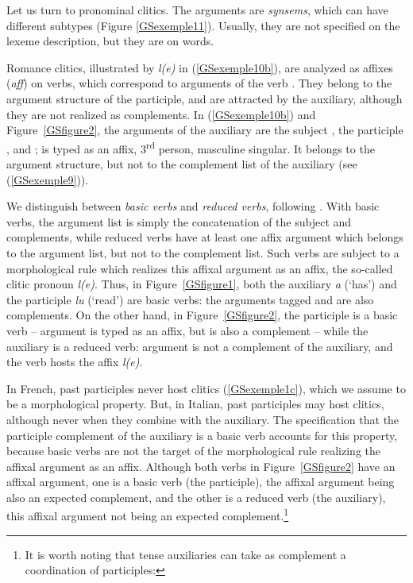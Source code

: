 \documentclass[output=paper
	        ,collection
	        ,collectionchapter
 	        ,biblatex
                ,babelshorthands
                ,newtxmath
                ,draftmode
                ,colorlinks, citecolor=brown
]{langscibook}
\begin{document}
{Let us turn to pronominal clitics. The arguments are \emph{synsems}, which can have different subtypes (Figure \ref{GSexemple11}). Usually, they are not specified on the lexeme description, but they are on
words.

Romance clitics, illustrated by \emph{l(e)} in (\ref{GSexemple10b}), are analyzed as affixes (\emph{aff}) on verbs, which correspond to arguments of the verb \citep{MS97a-u}. They belong to the argument structure of the participle, and are attracted by the auxiliary, although they are not realized as complements. In (\ref{GSexemple10b}) and Figure~\ref{GSfigure2}, the arguments of the auxiliary are the subject , the participle , and ;  is typed as an affix, 3\textsuperscript{rd} person, masculine singular. It belongs to the argument structure, but not to the complement list of the auxiliary (see (\ref{GSexemple9})).


We distinguish between \emph{basic verbs} and \emph{reduced verbs}, following \cite{AGS1998}. With basic verbs, the argument list is simply the concatenation of the subject and complements, while reduced verbs have at least one affix argument which belongs to the argument list, but not to the complement list. Such verbs are subject to a morphological rule which realizes this affixal argument as an affix, the so-called clitic pronoun \emph{l(e)}. Thus, in Figure~\ref{GSfigure1}, both the auxiliary \emph{a} (`has') and the participle \emph{lu} (`read') are basic verbs: the arguments tagged  and  are also complements. On the other hand, in Figure~\ref{GSfigure2}, the participle is a basic verb -- argument  is typed as an affix, but is also a complement -- while the auxiliary is a reduced verb: argument  is not a complement of the auxiliary, and the verb hosts the affix \emph{l(e)}.

In French, past participles never host clitics (\ref{GSexemple1c}), which we assume to be a morphological property. But, in Italian, past participles may host clitics, although never when they combine
with the auxiliary. The specification that the participle complement of the auxiliary is a basic verb accounts for this property, because basic verbs are not the target of the morphological rule realizing the affixal argument as an affix. Although both verbs in Figure~\ref{GSfigure2} have an affixal argument, one is a basic verb (the participle), the affixal argument being also an expected complement, and the other is a reduced verb (the auxiliary), this affixal argument not being an expected complement.\footnote{It is worth noting that tense auxiliaries can take as complement a coordination of participles:
	
}}
\end{document}
